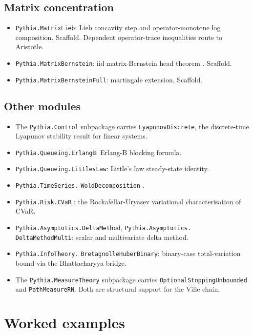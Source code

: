 \subsection{Matrix concentration}
\begin{itemize}[leftmargin=1.3em,itemsep=0.2em]
\item \texttt{Pythia.MatrixLieb}: Lieb concavity step
  \citep{lieb1973} and operator-monotone log composition. Scaffold.
  Dependent operator-trace inequalities route to Aristotle.
\item \texttt{Pythia.MatrixBernstein}: iid matrix-Bernstein head
  theorem \citep{tropp2012usermatrix}. Scaffold.
\item \texttt{Pythia.MatrixBernsteinFull}: martingale extension.
  Scaffold.
\end{itemize}

\subsection{Other modules}
\begin{itemize}[leftmargin=1.3em,itemsep=0.2em]
\item The \texttt{Pythia.Control} subpackage carries
  \texttt{LyapunovDiscrete}, the discrete-time Lyapunov stability
  result for linear systems.
\item \texttt{Pythia.Queueing.ErlangB}: Erlang-B blocking formula.
\item \texttt{Pythia.Queueing.LittlesLaw}: Little's law steady-state
  identity.
\item \texttt{Pythia.TimeSeries.} \texttt{WoldDecomposition} \citep{wold1938}.
\item \texttt{Pythia.Risk.CVaR} \citep{rockafellaruryasev2000}: the
  Rockafellar-Uryasev variational characterisation of CVaR.
\item \texttt{Pythia.Asymptotics.DeltaMethod},
  \texttt{Pythia.Asymptotics.} \texttt{DeltaMethodMulti}: scalar and
  multivariate delta method.
\item \texttt{Pythia.InfoTheory.} \texttt{BretagnolleHuberBinary}: binary-case
  total-variation bound via the Bhattacharyya bridge.
\item The \texttt{Pythia.MeasureTheory} subpackage carries
  \texttt{OptionalStoppingUnbounded} and \texttt{PathMeasureRN}.
  Both are structural support for the Ville chain.
\end{itemize}

\section{Worked examples}
\label{sec:appendix-worked}

